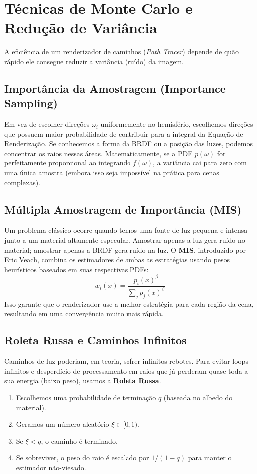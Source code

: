 \section{Técnicas de Monte Carlo e Redução de Variância}

A eficiência de um renderizador de caminhos (\textit{Path Tracer}) depende de quão rápido ele consegue reduzir a variância (ruído) da imagem.

\subsection{Importância da Amostragem (Importance Sampling)}

Em vez de escolher direções $\omega_i$ uniformemente no hemisfério, escolhemos direções que possuem maior probabilidade de contribuir para a integral da Equação de Renderização. Se conhecemos a forma da BRDF ou a posição das luzes, podemos concentrar os raios nessas áreas. Matematicamente, se a PDF $p(\omega)$ for perfeitamente proporcional ao integrando $f(\omega)$, a variância cai para zero com uma única amostra (embora isso seja impossível na prática para cenas complexas).

\subsection{Múltipla Amostragem de Importância (MIS)}

Um problema clássico ocorre quando temos uma fonte de luz pequena e intensa junto a um material altamente especular. Amostrar apenas a luz gera ruído no material; amostrar apenas a BRDF gera ruído na luz. O \textbf{MIS}, introduzido por Eric Veach, combina os estimadores de ambas as estratégias usando pesos heurísticos baseados em suas respectivas PDFs:
\begin{equation}
    w_i(x) = \frac{p_i(x)^\beta}{\sum_j p_j(x)^\beta}
\end{equation}
Isso garante que o renderizador use a melhor estratégia para cada região da cena, resultando em uma convergência muito mais rápida.

\subsection{Roleta Russa e Caminhos Infinitos}

Caminhos de luz poderiam, em teoria, sofrer infinitos rebotes. Para evitar loops infinitos e desperdício de processamento em raios que já perderam quase toda a sua energia (baixo peso), usamos a \textbf{Roleta Russa}.
\begin{enumerate}
    \item Escolhemos uma probabilidade de terminação $q$ (baseada no albedo do material).
    \item Geramos um número aleatório $\xi \in [0, 1)$.
    \item Se $\xi < q$, o caminho é terminado.
    \item Se sobreviver, o peso do raio é escalado por $1/(1-q)$ para manter o estimador não-viesado.
\end{enumerate}

